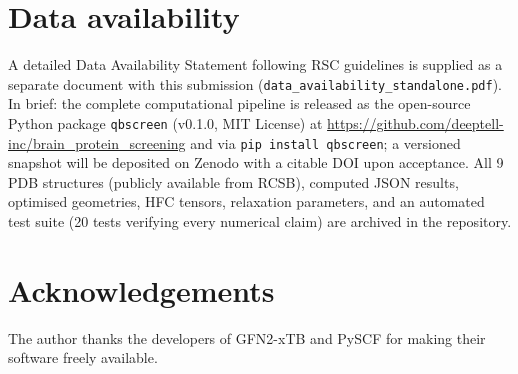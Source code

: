 \documentclass[twoside,twocolumn,9pt]{article}
\begin{document}
\section*{Data availability}
A detailed Data Availability Statement following RSC guidelines is supplied as a separate document with this submission (\texttt{data\_availability\_standalone.pdf}). In brief: the complete computational pipeline is released as the open-source Python package \texttt{qbscreen} (v0.1.0, MIT License) at \url{https://github.com/deeptell-inc/brain_protein_screening} and via \texttt{pip install qbscreen}; a versioned snapshot will be deposited on Zenodo with a citable DOI upon acceptance. All 9 PDB structures (publicly available from RCSB), computed JSON results, optimised geometries, HFC tensors, relaxation parameters, and an automated test suite (20 tests verifying every numerical claim) are archived in the repository.

\section*{Acknowledgements}
The author thanks the developers of GFN2-xTB and PySCF for making their software freely available.


\balance



\end{document}
